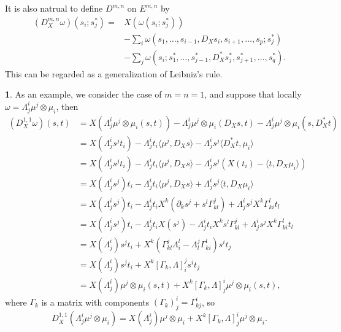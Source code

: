 \documentclass[11pt]{article}
\theoremstyle{definition}
\newtheorem{para}{}[part]
\theoremstyle{plain}
\begin{document}
It is also natrual to define $D^{m,n}$ on $E^{m,n}$ by
\begin{align*}
	(D^{m,n}_X\omega)(s_i;s^*_j)=&X(\omega(s_i;s^*_j))\\
	&-\sum_i \omega\left(s_{1},\dots,s_{i-1},D_X s_i,s_{i+1},\dots,s_p;s^*_j\right)\\
	&-\sum_j \omega\left(s_i;s^*_{1},\dots,s^*_{j-1},D^*_X s^*_j,s^*_{j+1},\dots,s^*_q\right).
\end{align*}
This can be regarded as a generalization of Leibniz's rule.

\begin{para}
As an example, we consider the case of $m=n=1$, and suppose that locally $\omega=\Lambda^i_j\mu^j\otimes \mu_i$, then
\begin{equation}\label{eq:1}
\begin{split}
	(D^{1,1}_X\omega)(s,t)&=X\left(\Lambda^i_j\mu^j\otimes \mu_i(s,t)\right)-\Lambda^i_j\mu^j\otimes \mu_i(D_Xs,t)-\Lambda^i_j\mu^j\otimes \mu_i(s,D^*_Xt)\\
	&=X\left(\Lambda^i_js^jt_i\right)-\Lambda^i_jt_i\langle\mu^j,D_Xs\rangle-\Lambda^i_js^j \langle D^*_Xt,\mu_i\rangle \\
	&=X\left(\Lambda^i_js^jt_i\right)-\Lambda^i_jt_i\langle\mu^j,D_Xs\rangle-\Lambda^i_js^j \left(X(t_i)-\langle t,D_X\mu_i\rangle\right) \\
	&=X\left(\Lambda^i_js^j\right)t_i-\Lambda^i_jt_i\langle\mu^j,D_Xs\rangle+\Lambda^i_js^j\langle t,D_X\mu_i\rangle \\
	&=X\left(\Lambda^i_js^j\right)t_i-\Lambda^i_jt_iX^k\left(\partial_ks^j+s^l\Gamma_{kl}^j\right)+\Lambda^i_js^jX^k\Gamma_{ki}^lt_l \\
	&=X\left(\Lambda^i_js^j\right)t_i-\Lambda^i_jt_iX(s^j)-\Lambda^i_jt_iX^ks^l\Gamma_{kl}^j+\Lambda^i_js^jX^k\Gamma_{ki}^lt_l \\
	&=X\left(\Lambda^i_j\right)s^jt_i+X^k\left(\Gamma_{kl}^j\Lambda^l_i-\Lambda^j_l\Gamma_{ki}^l\right)s^it_j \\
	&=X\left(\Lambda^i_j\right)s^jt_i+X^k [\Gamma_{k},\Lambda]^j_i s^it_j \\
	&=X\left(\Lambda^i_j\right)\mu^j\otimes \mu_i(s,t)+X^k [\Gamma_{k},\Lambda]^i_j\mu^j\otimes \mu_i(s,t),
\end{split}
\end{equation}
where $\Gamma_k$ is a matrix with components $(\Gamma_k)^i_j=\Gamma_{kj}^i$, so
\begin{equation}
D^{1,1}_X(\Lambda^i_j\mu^j\otimes \mu_i)=X\left(\Lambda^i_j\right)\mu^j\otimes \mu_i+X^k [\Gamma_{k},\Lambda]^i_j\mu^j\otimes \mu_i.
\end{equation}
\end{para}
\end{document}
